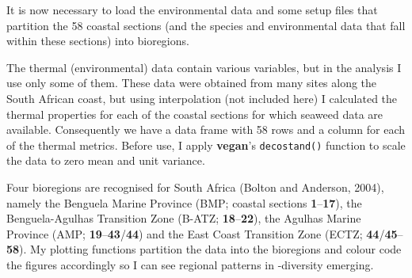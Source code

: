 \documentclass[10pt,A4,]{article}
\newenvironment{Shaded}{\begin{snugshade}}{\end{snugshade}}
\newcommand{\KeywordTok}[1]{\textcolor[rgb]{0.13,0.29,0.53}{\textbf{#1}}}
\newcommand{\StringTok}[1]{\textcolor[rgb]{0.31,0.60,0.02}{#1}}
\newcommand{\CommentTok}[1]{\textcolor[rgb]{0.56,0.35,0.01}{\textit{#1}}}
\newcommand{\NormalTok}[1]{#1}
\begin{document}
\begin{Shaded}
\end{Shaded}

It is now necessary to load the environmental data and some setup files
that partition the 58 coastal sections (and the species and
environmental data that fall within these sections) into bioregions.

The thermal (environmental) data contain various variables, but in the
analysis I use only some of them. These data were obtained from many
sites along the South African coast, but using interpolation (not
included here) I calculated the thermal properties for each of the
coastal sections for which seaweed data are available. Consequently we
have a data frame with 58 rows and a column for each of the thermal
metrics. Before use, I apply \textbf{vegan}'s \texttt{decostand()}
function to scale the data to zero mean and unit variance.

Four bioregions are recognised for South Africa (Bolton and Anderson,
2004), namely the Benguela Marine Province (BMP; coastal sections
\textbf{1}--\textbf{17}), the Benguela-Agulhas Transition Zone (B-ATZ;
\textbf{18}--\textbf{22}), the Agulhas Marine Province (AMP;
\textbf{19}--\textbf{43}/\textbf{44}) and the East Coast Transition Zone
(ECTZ; \textbf{44}/\textbf{45}--\textbf{58}). My plotting functions
partition the data into the bioregions and colour code the figures
accordingly so I can see regional patterns in \textbeta-diversity
emerging.
\end{document}
